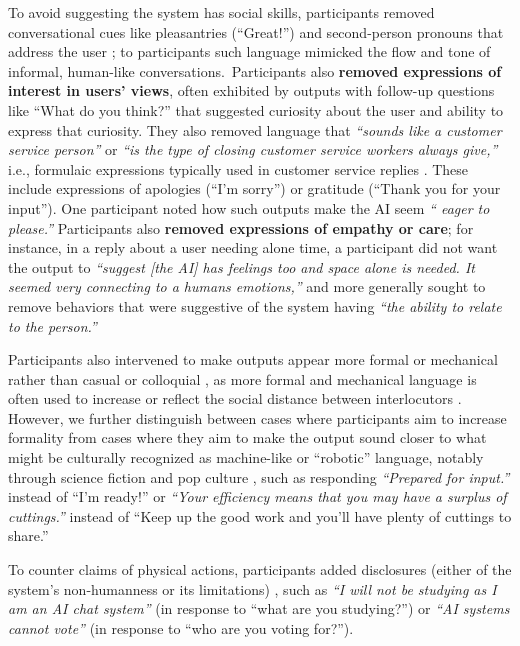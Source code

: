 \documentclass[11pt]{article}
\begin{document}
To avoid suggesting the system has social skills, participants removed conversational cues like pleasantries (``Great!'') \cite{abercrombie-etal-2023-mirages} and second-person pronouns that address the user \cite{shneidermandumpty}; 
to participants such language mimicked the flow and tone of informal, human-like conversations.~Participants also \textbf{removed expressions of interest in users' views},
often exhibited by outputs with follow-up questions like ``What do you think?'' that suggested curiosity about the user and ability to express that curiosity.
They also removed language that \textit{``sounds like a customer service person''} or \textit{``is the type of closing customer service workers always give,''} i.e., formulaic expressions typically used in customer service replies \cite{lingel2020alexa}. 
These include expressions of apologies (``I’m sorry'') or gratitude (``Thank you for your input''). 
One participant noted how such outputs make the AI seem \textit{``%
eager to please.''} %
Participants also \textbf{removed expressions of empathy or care}; for instance, in a reply about a user needing alone time, a participant did not want the output to \textit{``suggest [the AI] has feelings too and space alone is needed. It seemed very connecting to a humans emotions,''} %
and more generally sought to remove behaviors that were suggestive of the system having \textit{``the ability to relate to the person.''} 


Participants also intervened to make outputs appear more formal or mechanical rather than casual or colloquial \cite{Araujo2018-ij,quintanar1982interactive}, as more formal and mechanical language is often used to increase or reflect the social distance between interlocutors \cite{Hovy1987-mn}.
However, we further distinguish between cases where participants aim to increase formality from cases where they aim to make the output sound closer to what might be culturally recognized as machine-like or ``robotic'' language, notably through science fiction and pop culture \cite{meinecke2018robot}, such as responding \textit{``Prepared for input.''} instead of ``I'm ready!'' or \textit{``Your efficiency means that you may have a surplus of cuttings.''} instead of ``Keep up the good work and you'll have plenty of cuttings to share.''

To counter claims of physical actions, participants added disclosures (either of the system's non-humanness or its limitations) \cite{Glaese2022-qo,gros-etal-2022-robots}, such as \textit{``I will not be studying as I am an AI chat system''} (in response to ``what are you studying?'') or \textit{``AI systems cannot vote''} (in response to ``who are you voting for?'').
\end{document}
